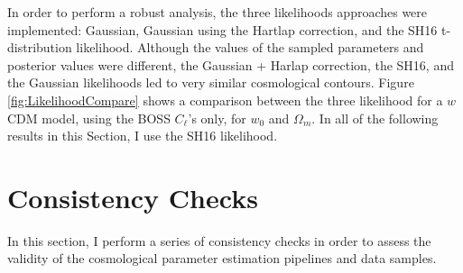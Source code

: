 \qquad In order to perform a robust analysis, the three likelihoods approaches were implemented: Gaussian, Gaussian using the Hartlap correction, and the SH16 t-distribution likelihood. Although the values of the sampled parameters and posterior values were different, the Gaussian + Harlap correction, the SH16, and the Gaussian likelihoods led to very similar cosmological contours. Figure \ref{fig:LikelihoodCompare} shows a comparison between the three likelihood for a $w$CDM
model, using the BOSS $C_{\ell}$'s only, for $w_0$ and $\Omega_m$. In all of the following results in this Section, I use the SH16 likelihood.


\section{Consistency Checks}
In this section, I perform a series of consistency checks in order to assess the validity of the cosmological parameter estimation pipelines and data samples. 

